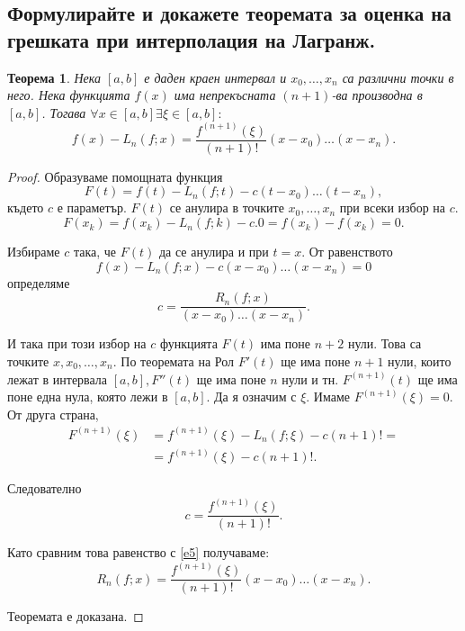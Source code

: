\documentclass[12pt]{article}
\numberwithin{equation}{subsection}
\newtheorem{theorem}{Теорема}
\numberwithin{theorem}{subsection}
\numberwithin{definition}{subsection}
\numberwithin{corollary}{subsection}
\begin{document}
\subsection{Формулирайте и докажете теоремата за оценка на грешката при интерполация на Лагранж.}
  \begin{theorem} \label{T2}
  Нека $[a,b]$ е даден краен интервал и $x_0, \dotso, x_n$ са различни точки в него. Нека функцията $f(x)$ има непрекъсната $(n+1)$-ва производна в $[a,b]$. Тогава $\forall x \in [a,b] \exists \xi \in [a,b] :$
  \begin{equation*}
  f(x)-L_n(f;x) = \frac{f^{(n+1)}(\xi)}{(n+1)!}(x-x_0)\dotso(x-x_n).
  \end{equation*}
  \end{theorem}
  \begin{proof}
  \par
  Образуваме помощната функция 
  \begin{equation*}
  F(t) = f(t) - L_n(f;t) - c(t-x_0)\dotso(t-x_n),
  \end{equation*}
  където $c$ е параметър. $F(t)$ се анулира в точките $x_0, \dotso, x_n$ при всеки избор на $c$.
  \begin{equation*}
  F(x_k) = f(x_k) - L_n(f;k) - c.0 = f(x_k) - f(x_k) = 0.
  \end{equation*}
  \par
  Избираме $c$ така, че $F(t)$ да се анулира и при $t=x$. От равенството
  \begin{equation*}
  f(x) - L_n(f;x) - c(x-x_0)\dotso(x-x_n) = 0
  \end{equation*}
  определяме
  \begin{equation}\label{e5}
  c = \frac{R_n(f;x)}{(x-x_0)\dotso(x-x_n)}.
  \end{equation}
  \par
  И така при този избор на $c$ функцията $F(t)$ има поне $n+2$ нули. Това са точките $x, x_0, \dotso, x_n$. По теоремата на Рол $F'(t)$ ще има поне $n+1$ нули, които лежат в интервала $[a,b], F''(t)$ ще има поне $n$ нули и тн. $F^{(n+1)}(t)$ ще има поне една нула, която лежи в $[a,b]$. Да я означим с $\xi$. Имаме $F^{(n+1)}(\xi) = 0$. От друга страна,
  \begin{align*}
  F^{(n+1)}(\xi) &= f^{(n+1)}(\xi) - L_n(f;\xi) - c(n+1)! =\\&= 
  f^{(n+1)}(\xi) - c(n+1)!.
  \end{align*}
  \par
  Следователно
  \begin{equation*}
  c = \frac{f^{(n+1)}(\xi)}{(n+1)!}.
  \end{equation*}
  \par
  Като сравним това равенство с \ref{e5} получаваме:
  \begin{equation*}
  R_n(f;x) = \frac{f^{(n+1)}(\xi)}{(n+1)!}(x-x_0)\dotso(x-x_n).
  \end{equation*}
  \par
  Теоремата е доказана.
  \end{proof}
\end{document}
